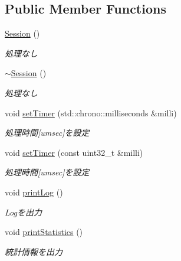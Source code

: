 \subsection*{Public Member Functions}
\begin{DoxyCompactItemize}
\item 
\mbox{\label{class_session_ad92ef09b872c9227e38a6efdd4d8a837}} 
\mbox{\hyperlink{class_session_ad92ef09b872c9227e38a6efdd4d8a837}{Session}} ()
\begin{DoxyCompactList}\small\item\em 処理なし \end{DoxyCompactList}\item 
\mbox{\hyperlink{class_session_a8753bb9dee966b7d39abc9b7237cd665}{$\sim$\+Session}} ()
\begin{DoxyCompactList}\small\item\em 処理なし \end{DoxyCompactList}\item 
\mbox{\label{class_session_ac021327c4e92076d0dc6a129e4bf5f7d}} 
void \mbox{\hyperlink{class_session_ac021327c4e92076d0dc6a129e4bf5f7d}{set\+Timer}} (std\+::chrono\+::milliseconds \&milli)
\begin{DoxyCompactList}\small\item\em 処理時間\mbox{[}umsec\mbox{]}を設定 \end{DoxyCompactList}\item 
void \mbox{\hyperlink{class_session_a04178216aff38a635e926a1983f64ff2}{set\+Timer}} (const uint32\+\_\+t \&milli)
\begin{DoxyCompactList}\small\item\em 処理時間\mbox{[}umsec\mbox{]}を設定 \end{DoxyCompactList}\item 
void \mbox{\hyperlink{class_session_ae2c389b0a37a29dfa05a55e6026b704d}{print\+Log}} ()
\begin{DoxyCompactList}\small\item\em Logを出力 \end{DoxyCompactList}\item 
void \mbox{\hyperlink{class_session_ae59450c62e173a51a22b50764f205bc6}{print\+Statistics}} ()
\begin{DoxyCompactList}\small\item\em 統計情報を出力 \end{DoxyCompactList}\item 

\end{DoxyCompactItemize}
